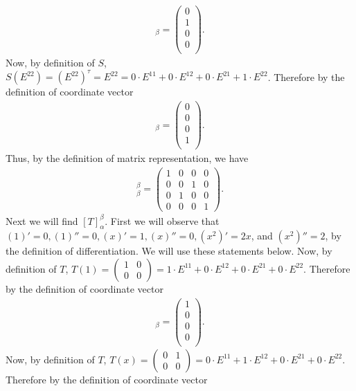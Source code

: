 \documentclass[12pt,answers]{exam}
\begin{document}
\begin{solution}
\begin{enumerate}[label=\roman*)]
\begin{align*}
    [S(E^{21})]_{\beta}=\begin{pmatrix} 0 \\ 1 \\ 0 \\ 0 \\ \end{pmatrix}.
\end{align*}
Now, by definition of $S$, $S(E^{22})=(E^{22})^{\tau}=E^{22}=0\cdot E^{11}+0\cdot E^{12}+0\cdot E^{21}+1\cdot E^{22}$. Therefore by the definition of coordinate vector
\begin{align*}
    [S(E^{22})]_{\beta}=\begin{pmatrix} 0 \\ 0 \\ 0 \\ 1 \\ \end{pmatrix}.
\end{align*}
Thus, by the definition of matrix representation, we have
\begin{align*}
    [S]^{\beta}_{\beta}=\begin{pmatrix} 1 & 0 & 0 & 0 \\
                                        0 & 0 & 1 & 0 \\
                                        0 & 1 & 0 & 0 \\
                                        0 & 0 & 0 & 1 \end{pmatrix}.
\end{align*}
Next we will find $[T]^{\beta}_{\alpha}$. First we will observe that $(1)'=0,(1)''=0,(x)'=1,(x)''=0,(x^2)'=2x$, and $(x^2)''=2$, by the definition of differentiation. We will use these statements below. Now, by definition of $T$, $T(1)=\begin{pmatrix} 1 & 0 \\ 0 & 0 \end{pmatrix}=1\cdot E^{11}+0\cdot E^{12}+0\cdot E^{21}+0\cdot E^{22}$. Therefore by the definition of coordinate vector
\begin{align*}
    [T(1)]_{\beta}=\begin{pmatrix} 1 \\ 0 \\ 0 \\ 0 \\ \end{pmatrix}.
\end{align*}
Now, by definition of $T$, $T(x)=\begin{pmatrix} 0 & 1 \\ 0 & 0 \end{pmatrix}=0\cdot E^{11}+1\cdot E^{12}+0\cdot E^{21}+0\cdot E^{22}$. Therefore by the definition of coordinate vector

\end{enumerate}
\end{solution}
\end{document}
